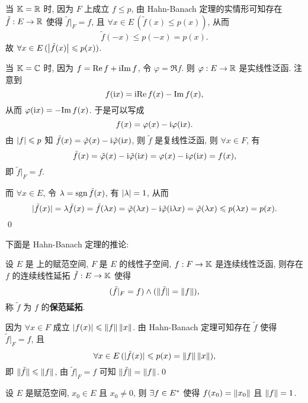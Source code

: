     \begin{Proof}
        当 $ \mathbb{K} = \mathbb{R} $ 时, 因为 $ F $ 上成立 $ f\leqslant p $, 由 Hahn-Banach 定理的实情形可知存在 $ \tilde{f}:E\to \mathbb{R} $ 使得 $ \tilde{f}|_{F}=f $, 且 $ \forall x\in E\,(\tilde{f}(x)\leqslant p(x)) $, 从而
        \[
            \tilde{f}(-x)\leqslant p(-x) = p(x).
        \]
        故 $ \forall x\in E\,(\left| \tilde{f}(x) \right| \leqslant p(x)) $.

        当 $ \mathbb{K}=\mathbb{C} $ 时, 因为 $ f=\mathrm{Re\,} f+\mathrm{i} \mathrm{Im\,} f $, 令 $ \varphi = \Re f $. 则 $ \varphi:E\to\mathbb{R} $ 是实线性泛函. 注意到
        \[
            f(\mathrm{i} x)= \mathrm{i} \mathrm{Re\,} f(x) - \mathrm{Im\,} f(x),
        \]
        从而 $ \varphi(\mathrm{i} x)=-\mathrm{Im\,} f(x) $. 于是可以写成
        \[
            f(x)=\varphi(x)-\mathrm{i} \varphi(\mathrm{i} x).
        \]
        由 $ \left| f \right| \leqslant p $ 知 $ \tilde{f}(x)=\tilde{\varphi}(x)-\mathrm{i}\tilde{\varphi}(\mathrm{i} x) $, 则 $ \tilde{f} $ 是复线性泛函, 则 $ \forall x\in F $, 有
        \[
            \tilde{f}(x)=\tilde{\varphi}(x)-\mathrm{i}\tilde{\varphi}(\mathrm{i} x)= \varphi(x)-\mathrm{i}\varphi(\mathrm{i} x)=f(x),
        \]
        即 $ \tilde{f}|_{F}=f $.

        而 $ \forall x\in E $, 令 $ \lambda=\mathrm{sgn}\,\tilde{f}(x) $, 有 $ \left| \lambda \right| =1 $, 从而
        \[
            |\tilde{f}(x)|=\lambda\tilde{f}(x)=\tilde{f}(\lambda x)= \tilde{\varphi}(\lambda x)-\mathrm{i} \tilde{\varphi}(\mathrm{i}\lambda x)=\tilde{\varphi}(\lambda x)\leqslant p(\lambda x)=p(x).
        \]
        \qed
    \end{Proof}
    下面是 Hahn-Banach 定理的推论:
    \begin{Corollary}\label{cor:保范延拓}
        设 $ E $ 是 \K 上的赋范空间, $ F $ 是 $ E $ 的线性子空间, $ f:F\to\mathbb{K} $ 是连续线性泛函, 则存在 $ f $ 的连续线性延拓 $ \tilde{f}:E\to\mathbb{K} $ 使得
        \[
            (\tilde{f}|_{F}=f)\land (\|\tilde{f}\|=\left\| f \right\|),
        \]
        称 $ \tilde{f} $ 为 $ f $ 的\textbf{保范延拓}.
    \end{Corollary}
    \begin{Proof}
        因为 $ \forall x\in F $ 成立 $ \left| f(x) \right| \leqslant\left\| f \right\|\left\| x \right\| $. 由 Hahn-Banach 定理可知存在 $ \tilde{f} $ 使得 $ \tilde{f}|_{F}=f $, 且
        \[
            \forall x\in E\,(|\tilde{f}(x)|\leqslant p(x)=\left\| f \right\|\left\| x \right\|),
        \]
        即 $ \|\tilde{f}\|\leqslant \left\| f \right\| $, 由 $ \tilde{f}|_{F}=f $ 可知 $ \|\tilde{f}\|=\left\| f \right\| $.\qed
    \end{Proof}
    \begin{Corollary}\label{cor:HB2}
        设 $ E $ 是赋范空间, $ x_{0}\in E $ 且 $ x_{0}\ne 0 $, 则 $ \exists f\in E^{*} $ 使得 $ f(x_{0})=\left\| x_{0} \right\| $ 且 $ \left\| f \right\|=1 $.
    \end{Corollary}

